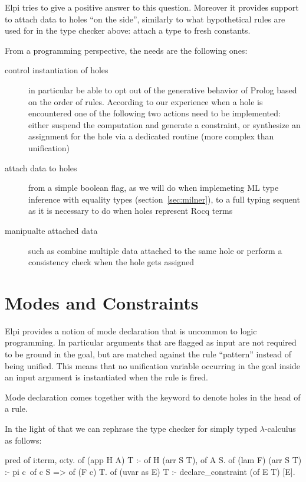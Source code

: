 \documentclass[a4paper, 11pt]{book}
\begin{document}
Elpi tries to give a positive answer to this question. Moreover it provides
support to attach data to holes ``on the side'', similarly to what
hypothetical rules are used for in the type checker above: attach a type
to fresh constants.

From a programming perspective, the needs are the following ones:

\begin{description}
  \item[control instantiation of holes] in particular be able to opt out of the
     generative behavior of Prolog based on the order of rules. According to
     our experience when a hole is encountered one of the following two
     actions need to be implemented: either suspend the computation and
     generate a constraint, or synthesize an assignment for the hole
     via a dedicated routine (more complex than unification)
  \item[attach data to holes] from a simple boolean flag, as we will do
    when implemeting ML type inference with equality types (section~\ref{sec:milner}),
    to a full typing sequent as it is necessary to do when holes represent
    Rocq terms

  \item[manipualte attached data] such as combine multiple data attached to the same
     hole or perform a consistency check when the hole gets assigned

\end{description}


\section{Modes and Constraints}\label{sec:modes}

Elpi provides a notion of mode declaration that is uncommon to logic programming.
In particular arguments that are flagged as input are not required to be
ground in the goal, but are matched against the rule ``pattern'' instead 
of being unified. This means that no unification variable occurring in
the goal inside an input argument is instantiated when the rule is
fired.

Mode declaration comes together with the  keyword to denote
holes in the head of a rule.

In the light of that we can rephrase the type checker for simply typed
$\lambda$-calculus as follows:

\begin{elpicode}
pred of i:term, o:ty.
of (app H A) T :- of H (arr S T), of A S.
of (lam F) (arr S T) :- pi c\ of c S => of (F c) T.
of (uvar as E) T :- declare_constraint (of E T) [E].
\end{elpicode} 
\end{document}
